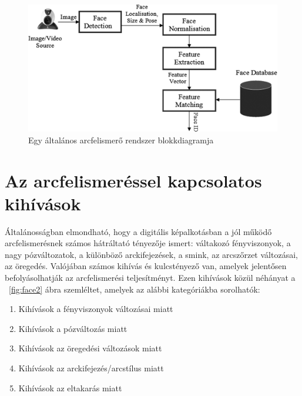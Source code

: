 \begin{figure}
	\includegraphics[width=\textwidth]{figures/facedetection_components.jpeg}
	\caption{Egy általános arcfelismerő rendszer blokkdiagramja \cite{9}}
	\label{fig:face1}
\end{figure}

\section{Az arcfelismeréssel kapcsolatos kihívások}
Általánosságban elmondható, hogy a digitális képalkotásban a jól működő arcfelismerésnek számos hátráltató tényezője ismert: váltakozó fényviszonyok, a nagy pózváltozatok, a különböző arckifejezések, a smink, az arcszőrzet változásai, az öregedés.
Valójában számos kihívás és kulcstényező van, amelyek jelentősen befolyásolhatják az arcfelismerési teljesítményt. Ezen kihívások közül néhányat a ~\ref{fig:face2} ábra szemléltet, amelyek az alábbi kategóriákba sorolhatók:

\begin{enumerate}[label=(\alph*)]
    \item Kihívások a fényviszonyok változásai miatt
    \item Kihívások a pózváltozás miatt
    \item Kihívások az öregedési változások miatt
    \item Kihívások az arckifejezés/arcstílus miatt
    \item Kihívások az eltakarás miatt
\end{enumerate}

